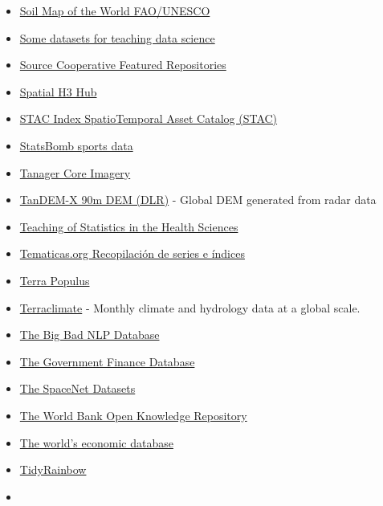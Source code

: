 \documentclass[
  letterpaper,
  DIV=11,
  numbers=noendperiod]{scrartcl}
\begin{document}
\begin{itemize}
  y \href{https://earthdata.nasa.gov/centers/sedac-daac}{Link2}
\item
  \href{https://www.fao.org/soils-portal/data-hub/soil-maps-and-databases/faounesco-soil-map-of-the-world/en/}{Soil
  Map of the World FAO/UNESCO}
\item
  \href{https://simplystatistics.org/posts/2018-01-22-the-dslabs-package-provides-datasets-for-teaching-data-science/}{Some
  datasets for teaching data science}
\item
  \href{https://beta.source.coop/}{Source Cooperative Featured
  Repositories}
\item
  \href{https://spatial-h3-hub.foursquare.com/}{Spatial H3 Hub}
\item
  \href{https://github.com/opengeos/stac-index-catalogs}{STAC Index
  SpatioTemporal Asset Catalog (STAC)}
\item
  \href{https://statsbomb.com/what-we-do/hub/free-data/}{StatsBomb
  sports data}
\item
  \href{https://www.planet.com/data/stac/browser/tanager-core-imagery/catalog.json?.language=es}{Tanager
  Core Imagery}
\item
  \href{https://download.geoservice.dlr.de/TDM90/}{TanDEM-X 90m DEM
  (DLR)} - Global DEM generated from radar data
\item
  \href{https://causeweb.org/tshs/}{Teaching of Statistics in the Health
  Sciences}
\item
  \href{https://tematicas.org/}{Tematicas.org Recopilación de series e
  índices}
\item
  \href{https://terra.ipums.org/}{Terra Populus}
\item
  \href{https://www.climatologylab.org/terraclimate.html}{Terraclimate}
  - Monthly climate and hydrology data at a global scale.
\item
  \href{https://quantumstat.com/nlp-dataset-library/}{The Big Bad NLP
  Database}
\item
  \href{https://willamette.edu/mba/research-impact/public-datasets/index.html}{The
  Government Finance Database}
\item
  \href{https://spacenet.ai/datasets/}{The SpaceNet Datasets}
\item
  \href{https://openknowledge.worldbank.org}{The World Bank Open
  Knowledge Repository}
\item
  \href{https://db.nomics.world/}{The world's economic database}
\item
  \href{https://github.com/r-lgbtq/tidyrainbow}{TidyRainbow}
\item

\end{itemize}
\end{document}
